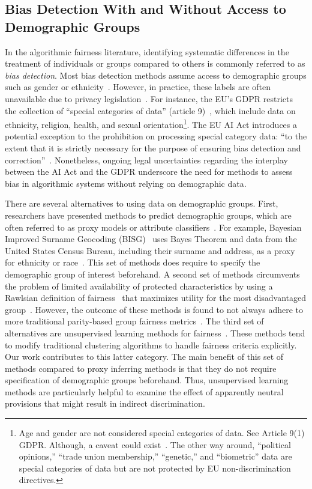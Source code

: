 \subsection{Bias Detection With and Without Access to Demographic Groups}
In the algorithmic fairness literature, identifying systematic differences in the treatment of individuals or groups compared to others is commonly referred to as \emph{bias detection}. Most bias detection methods assume access to demographic groups such as gender or ethnicity~\cite{Aif360,Hardt2016, Kusner2017, Kleinberg2018,delaney2024oxonfair}. However, in practice, these labels are often unavailable due to privacy legislation~\citep{van2023using}. For instance, the EU's GDPR restricts the collection of ``special categories of data'' (article 9)~\citep{gdpr}, which include data on ethnicity, religion, health, and sexual orientation\footnote{Age and gender are not considered special categories of data. See Article 9(1) GDPR. Although, a caveat could exist~\citep{van2018trans}. The other way around, ``political opinions,'' ``trade union membership,'' ``genetic,'' and ``biometric'' data are special categories of data but are not protected by EU non-discrimination directives.}. The EU AI Act introduces a potential exception to the prohibition on processing special category data: ``to the extent that it is strictly necessary for the purpose of ensuring bias detection and correction''~\cite{AIAct}. Nonetheless, ongoing legal uncertainties regarding the interplay between the AI Act and the GDPR underscore the need for methods to assess bias in algorithmic systems without relying on demographic data.

There are several alternatives to using data on demographic groups. First, researchers have presented methods to predict demographic groups, which are often referred to as proxy models or attribute classifiers~\cite{ashurst2023fairness}. For example, Bayesian Improved Surname Geocoding (BISG)~\cite{Elliot2009} uses Bayes Theorem and data from the United States Census Bureau, including their surname and address, as a proxy for ethnicity or race~\citep{ashurst2023fairness}. This set of methods does require to specify the demographic group of interest beforehand. A second set of methods circumvents the problem of limited availability of protected characteristics by using a Rawlsian definition of fairness~\citep{rawls2001justice} that maximizes utility for the most disadvantaged group~\citep{lahoti2020fairness, hashimoto2018fairness, chai2022self}. However, the outcome of these methods is found to not always adhere to more traditional parity-based group fairness metrics~\citep{islam2024fairness}. The third set of alternatives are unsupervised learning methods for fairness~\citep{Nasiriani_2019, 2021BMVC_UDIS}. These methods tend to modify traditional clustering algorithms to handle fairness criteria explicitly. Our work contributes to this latter category. The main benefit of this set of methods compared to proxy inferring methods is that they do not require specification of demographic groups beforehand. Thus, unsupervised learning methods are particularly helpful to examine the effect of apparently neutral provisions that might result in indirect discrimination. 


